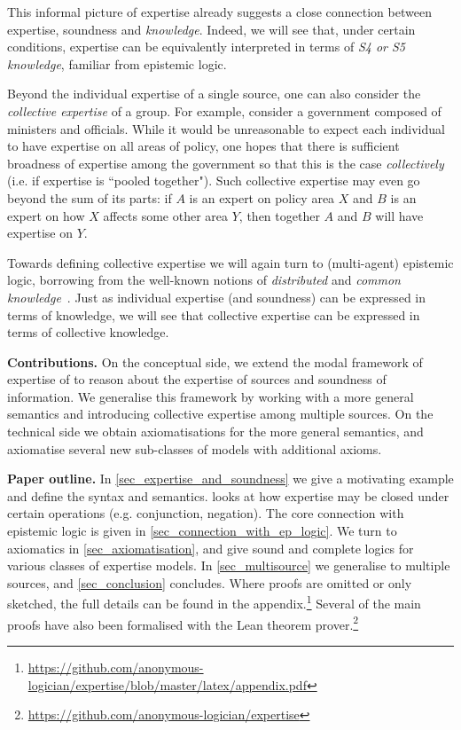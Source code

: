 This informal picture of expertise already suggests a close connection between
expertise, soundness and \emph{knowledge}. Indeed, we will see that, under
certain conditions, expertise can be equivalently interpreted in terms of
\emph{S4 or S5 knowledge}, familiar from epistemic logic.

Beyond the individual expertise of a single source, one can also consider the
\emph{collective expertise} of a group. For example, consider a government
composed of ministers and officials. While it would be unreasonable to expect
each individual to have expertise on all areas of policy, one hopes that there
is sufficient broadness of expertise among the government so that this is the
case \emph{collectively} (i.e. if expertise is ``pooled together"). Such
collective expertise may even go beyond the sum of its parts: if $A$ is an
expert on policy area $X$ and $B$ is an expert on how $X$ affects some other
area $Y$, then together $A$ and $B$ will have expertise on $Y$.

Towards defining collective expertise we will again turn to (multi-agent)
epistemic logic, borrowing from the well-known notions of \emph{distributed}
and \emph{common knowledge}~\citep{fagin2003reasoning}. Just as individual
expertise (and soundness) can be expressed in terms of knowledge, we will see
that collective expertise can be expressed in terms of collective knowledge.

\textbf{Contributions.} On the conceptual side, we extend the modal framework
of expertise of \citet{singleton2021logic} to reason about the expertise of
sources and soundness of information. We generalise this framework by working
with a more general semantics and introducing collective expertise among
multiple sources.
%
On the technical side we obtain axiomatisations for the more general semantics,
and axiomatise several new sub-classes of models with additional axioms.

\textbf{Paper outline.} In \cref{sec_expertise_and_soundness} we give a
motivating example and define the syntax and semantics.
 looks at how expertise may be closed under
certain operations (e.g. conjunction, negation). The core connection with
epistemic logic is given in \cref{sec_connection_with_ep_logic}. We turn to
axiomatics in \cref{sec_axiomatisation}, and give sound and complete logics for
various classes of expertise models. In \cref{sec_multisource} we generalise to
multiple sources, and \cref{sec_conclusion} concludes. Where proofs are omitted
or only sketched, the full details can be found in the
appendix.\footnote{\url{https://github.com/anonymous-logician/expertise/blob/master/latex/appendix.pdf}}
Several of the main proofs have also been formalised with the Lean theorem
prover.\footnote{\url{https://github.com/anonymous-logician/expertise}}

